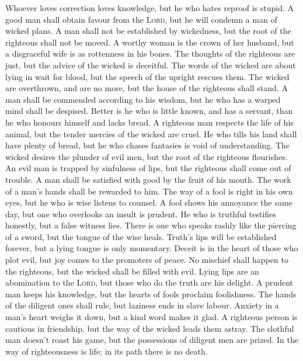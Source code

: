  Whoever loves correction loves knowledge, but he who
hates reproof is stupid.  A good man shall obtain favour
from the \textsc{Lord}, but he will condemn a man of wicked plans.
 A man shall not be established by wickedness, but the
root of the righteous shall not be moved.  A worthy woman
is the crown of her husband, but a disgraceful wife is as rottenness in
his bones.  The thoughts of the righteous are just, but
the advice of the wicked is deceitful.  The words of the
wicked are about lying in wait for blood, but the speech of the upright
rescues them.  The wicked are overthrown, and are no more,
but the house of the righteous shall stand.  A man shall
be commended according to his wisdom, but he who has a warped mind shall
be despised.  Better is he who is little known, and has a
servant, than he who honours himself and lacks bread.  A
righteous man respects the life of his animal, but the tender mercies of
the wicked are cruel.  He who tills his land shall have
plenty of bread, but he who chases fantasies is void of understanding.
 The wicked desires the plunder of evil men, but the root
of the righteous flourishes.  An evil man is trapped by
sinfulness of lips, but the righteous shall come out of trouble.
 A man shall be satisfied with good by the fruit of his
mouth. The work of a man's hands shall be rewarded to him.
 The way of a fool is right in his own eyes, but he who
is wise listens to counsel.  A fool shows his annoyance
the same day, but one who overlooks an insult is prudent.
 He who is truthful testifies honestly, but a false
witness lies.  There is one who speaks rashly like the
piercing of a sword, but the tongue of the wise heals. 
Truth's lips will be established forever, but a lying tongue is only
momentary.  Deceit is in the heart of those who plot
evil, but joy comes to the promoters of peace.  No
mischief shall happen to the righteous, but the wicked shall be filled
with evil.  Lying lips are an abomination to the
\textsc{Lord}, but those who do the truth are his delight.
 A prudent man keeps his knowledge, but the hearts of
fools proclaim foolishness.  The hands of the diligent
ones shall rule, but laziness ends in slave labour. 
Anxiety in a man's heart weighs it down, but a kind word makes it glad.
 A righteous person is cautious in friendship, but the
way of the wicked leads them astray.  The slothful man
doesn't roast his game, but the possessions of diligent men are prized.
 In the way of righteousness is life; in its path there
is no death.


